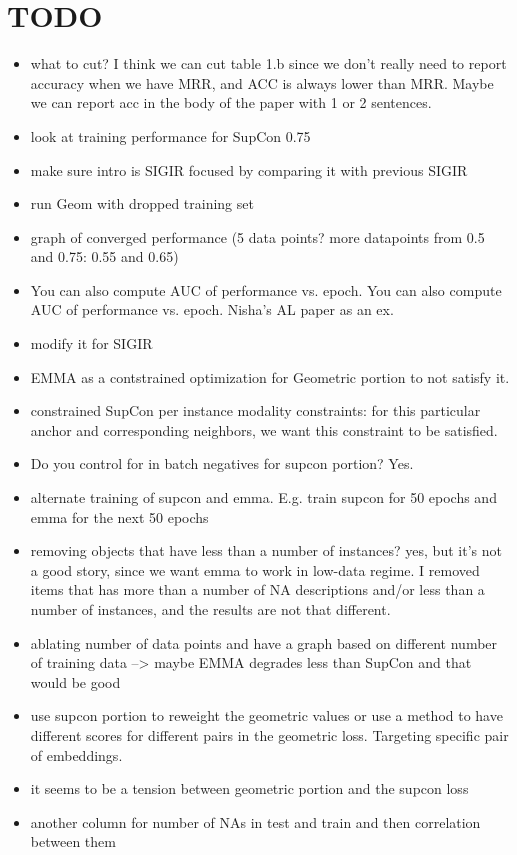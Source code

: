 \section{TODO}
\begin{itemize}

    \item \OK what to cut?
    I think we can cut table 1.b since we don't really need to report accuracy when we have MRR, and ACC is always lower than MRR. Maybe we can report acc in the body of the paper with 1 or 2 sentences.
    \item \TD look at training performance for SupCon 0.75
    \item \TD make sure intro is SIGIR focused by comparing it with previous SIGIR
    \item \OK run Geom with dropped training set 
    \item \OK graph of converged performance (5 data points? more datapoints from 0.5 and 0.75: 0.55 and 0.65)
    \item \TD You can also compute AUC of performance vs. epoch. You can also compute AUC of performance vs. epoch. Nisha's AL paper as an ex.
    \item \OK modify it for SIGIR
    \item \TD EMMA as a contstrained optimization for Geometric portion to not satisfy it.
    \item \TD constrained SupCon per instance modality constraints: for this particular anchor and corresponding neighbors, we want this constraint to be satisfied.
    \item \OK Do you control for in batch negatives for supcon portion? Yes.
    \item \TD alternate training of supcon and emma. E.g. train supcon for 50 epochs and emma for the next 50 epochs
    \item \OK removing objects that have less than a number of instances? yes, but it's not a good story, since we want emma to work in low-data regime. I removed items that has more than a number of NA descriptions and/or less than a number of instances, and the results are not that different.
    \item \DO ablating number of data points and have a graph based on different number of training data --> maybe EMMA degrades less than SupCon and that would be good
    \item \TD use supcon portion to reweight the geometric values or use a method to have different scores for different pairs in the geometric loss. Targeting specific pair of embeddings.
    \item \TD it seems to be a tension between geometric portion and the supcon loss
    \item \OK another column for number of NAs in test and train and then correlation between them


\end{itemize}
